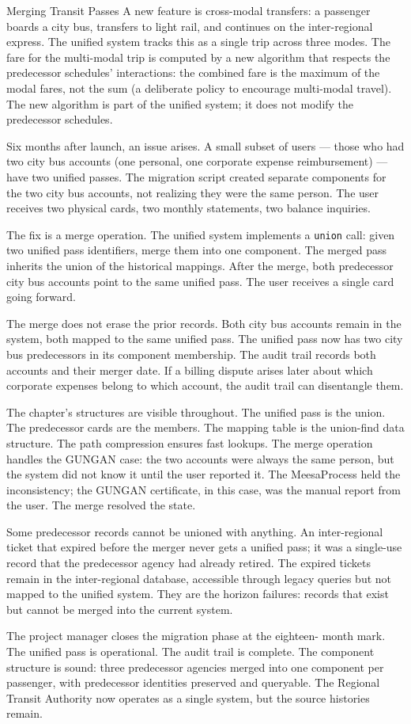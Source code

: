 \begin{coda}{Merging Transit Passes}
A new feature is cross-modal transfers: a passenger boards a city
bus, transfers to light rail, and continues on the inter-regional
express. The unified system tracks this as a single trip across
three modes. The fare for the multi-modal trip is computed by a new
algorithm that respects the predecessor schedules' interactions: the
combined fare is the maximum of the modal fares, not the sum (a
deliberate policy to encourage multi-modal travel). The new
algorithm is part of the unified system; it does not modify the
predecessor schedules.

Six months after launch, an issue arises. A small subset of users ---
those who had two city bus accounts (one personal, one corporate
expense reimbursement) --- have two unified passes. The migration
script created separate components for the two city bus accounts,
not realizing they were the same person. The user receives two
physical cards, two monthly statements, two balance inquiries.

The fix is a merge operation. The unified system implements a
\texttt{union} call: given two unified pass identifiers, merge them
into one component. The merged pass inherits the union of the
historical mappings. After the merge, both predecessor city bus
accounts point to the same unified pass. The user receives a single
card going forward.

The merge does not erase the prior records. Both city bus accounts
remain in the system, both mapped to the same unified pass. The
unified pass now has two city bus predecessors in its component
membership. The audit trail records both accounts and their merger
date. If a billing dispute arises later about which corporate
expenses belong to which account, the audit trail can disentangle
them.

The chapter's structures are visible throughout. The unified pass
is the union. The predecessor cards are the members. The mapping
table is the union-find data structure. The path compression
ensures fast lookups. The merge operation handles the GUNGAN case:
the two accounts were always the same person, but the system did
not know it until the user reported it. The MeesaProcess held the
inconsistency; the GUNGAN certificate, in this case, was the
manual report from the user. The merge resolved the state.

Some predecessor records cannot be unioned with anything. An
inter-regional ticket that expired before the merger never gets a
unified pass; it was a single-use record that the predecessor
agency had already retired. The expired tickets remain in the
inter-regional database, accessible through legacy queries but not
mapped to the unified system. They are the horizon failures: records
that exist but cannot be merged into the current system.

The project manager closes the migration phase at the eighteen-
month mark. The unified pass is operational. The audit trail is
complete. The component structure is sound: three predecessor
agencies merged into one component per passenger, with predecessor
identities preserved and queryable. The Regional Transit Authority
now operates as a single system, but the source histories remain.

\end{coda}
